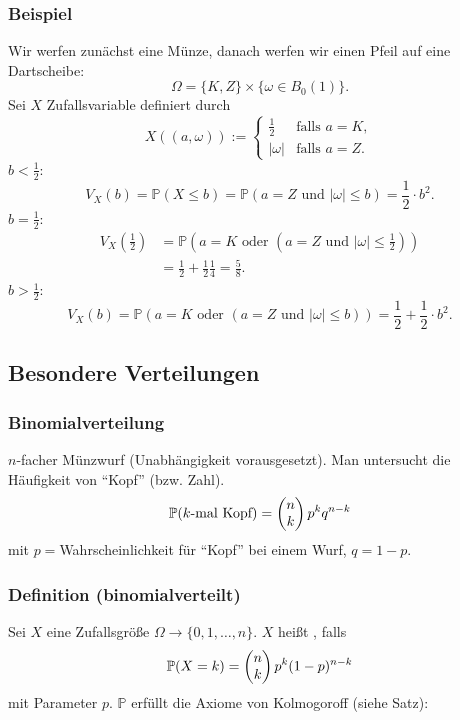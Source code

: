 \subsubsection{Beispiel}
Wir werfen zun\"achst eine M\"unze, danach werfen wir einen Pfeil auf eine Dartscheibe:
\[
\Omega=\{K,Z\}\times\{\omega\in B_0(1)\}.
\]
Sei $X$ Zufallsvariable definiert durch
\[
X((a,\omega)):=
\begin{cases}
\frac{1}{2}&\text{falls }a=K,\\
|\omega|&\text{falls }a=Z.
\end{cases}
\]
$b<\frac{1}{2}$:
\[
V_X(b)=\mathbb{P}(X\leq b)=\mathbb{P}(a=Z\text{ und }|\omega|\leq b)=\frac{1}{2}\cdot b^2.
\]
$b=\frac{1}{2}$:
\begin{align*}
V_X(\frac{1}{2})&=\mathbb{P}(a=K\text{ oder }(a=Z\text{ und }|\omega|\leq\frac{1}{2}))\\
&=\frac{1}{2}+\frac{1}{2}\frac{1}{4}=\frac{5}{8}.
\end{align*}
$b>\frac{1}{2}$:
\[
V_X(b)=\mathbb{P}(a=K\text{ oder }(a=Z\text{ und }|\omega|\leq b))=\frac{1}{2}+\frac{1}{2}\cdot b^2.
\]
\subsection{Besondere Verteilungen}
\subsubsection{Binomialverteilung}
$n$-facher M\"unzwurf (Unabh\"angigkeit vorausgesetzt). Man untersucht die H\"aufigkeit von ``Kopf'' (bzw. Zahl).
\[
\mathbb{P}(k\text{-mal Kopf})=\begin{pmatrix}n\\k\end{pmatrix}p^kq^{n-k}
\]
mit $p=$Wahrscheinlichkeit f\"ur ``Kopf'' bei einem Wurf, $q=1-p$.
\subsubsection{Definition (binomialverteilt)}
Sei $X$ eine Zufallsgr\"o\ss{}e $\Omega\to\{0,1,\ldots,n\}$. $X$ hei\ss{}t , falls
\[
\mathbb{P}(X=k)=\begin{pmatrix}n\\k\end{pmatrix}p^k(1-p)^{n-k}
\]
mit Parameter $p$. $\mathbb{P}$ erf\"ullt die Axiome von Kolmogoroff (siehe Satz):
